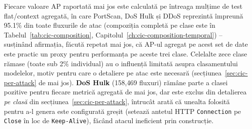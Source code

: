 Fiecare valoare AP raportată mai jos este calculată pe întreaga mulțime de test flat/context agregată, în care PortScan, DoS Hulk și DDoS reprezintă împreună 95.1\% din toate fluxurile de atac (compoziția completă pe clase este în Tabelul~\ref{tab:cic-composition}, Capitolul~\ref{ch:cic-composition-temporal}) -- susținând afirmația, făcută repetat mai jos, că AP-ul agregat pe acest set de date este practic un proxy pentru performanța pe aceste trei clase. Celelalte zece clase rămase (toate sub 2\% individual) au o influență limitată asupra clasamentului modelelor, motiv pentru care o detaliere pe atac este necesară (secțiunea~\ref{sec:cic-per-attack} de mai jos).
\textbf{DoS Hulk} (158{,}469 fluxuri) rămâne parte a clasei pozitive pentru fiecare metrică agregată de mai jos, dar este exclus din detalierea \emph{pe clasă} din secțiunea~\ref{sec:cic-per-attack}, întrucât \textcite{engelen2021troubleshooting} arată că unealta folosită pentru a-l genera este configurată greșit (setează antetul HTTP \texttt{Connection} pe \texttt{Close} în loc de \texttt{Keep-Alive}), făcând atacul ineficient prin construcție.

